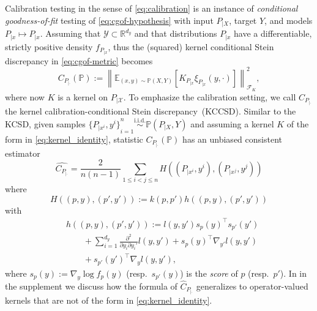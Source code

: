 \documentclass{uai2023} %
\begin{document}
Calibration testing in the sense of \cref{eq:calibration} is an instance of \emph{conditional goodness-of-fit} testing of \cref{eq:cgof-hypothesis} with input $P_{|X}$, target $Y$, and models $P_{|x} \mapsto P_{|x}$.
Assuming that $\mathcal{Y} \subset \mathbb{R}^{d_y}$ and that distributions $P_{|x}$ have a differentiable, strictly positive density $f_{P_{|x}}$,
thus the (squared) kernel conditional Stein discrepancy in \cref{eq:cgof-metric} becomes
\begin{equation}\label{eq:calibration-cgof-metric}
    C_{P_{|\cdot}}(\mathbb{P}) := \left \| \mathbb{E}_{(x,y) \sim \mathbb{P}(X, Y)}\left [ K_{P_{|x}} \xi_{P_{|x}}(y, \cdot) \right ]  \right \|^{2}_{\mathcal  F_{K}},
\end{equation}
where now $K$ is a kernel on $P_{|\mathcal{X}}$.
To emphasize the calibration setting, we call $C_{P_{|\cdot}}$ the kernel calibration-conditional Stein discrepancy~(KCCSD).
Similar to the KCSD, given samples ${\{P_{|x^i}, y^i\}}_{i=1}^n \stackrel{\text{i.i.d.}}{\sim} \mathbb{P}(P_{|X}, Y)$ and assuming a kernel $K$ of the form in \cref{eq:kernel_identity}, statistic $C_{P_{|\cdot}}(\mathbb{P})$ has an unbiased consistent estimator
\begin{equation*}\label{eq:calibration-gof-estimator}
    \widehat{C_{P_{|\cdot}}} = \frac{2}{n(n - 1)} \sum_{1 \leq i < j \leq n} H((P_{|x^i}, y^i), (P_{|x^j}, y^j))
\end{equation*}
where
\begin{equation}\label{eq:calibration-cgof-test-statistic}
    H((p, y), (p', y')) := k(p, p') h((p, y), (p', y'))
\end{equation}
with
\begin{equation}\label{eq:calibration-cgof-test-statistic-h}
\begin{split}
    &h((p, y), (p', y')) := l(y, y') s_p(y)^{\top} s_{p'}(y') \\
    &\qquad+ \sum\limits_{i=1}^{d_y} \frac{\partial^2}{ \partial y_i \partial y_i'} l(y, y')
    + s_p(y)^{\top} \nabla_{y'} l(y, y') \\
    &\qquad+ s_{p'}(y')^{\top} \nabla_{y} l(y, y'),
\end{split}
\end{equation}
where $s_{p}(y) := \nabla_y \log f_{p}(y)$ (resp.\ $s_{p'}(y)$) is the \emph{score} of $p$ (resp.\ $p'$).
In  in the supplement we discuss how the formula of $\widehat{C}_{P_{|\cdot}}$ generalizes to operator-valued kernels that are not of the form in \cref{eq:kernel_identity}.
\end{document}
